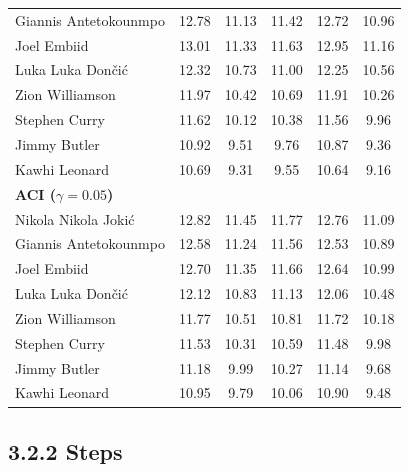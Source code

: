 \documentclass[11pt,a4paper]{article}
\begin{document}
\begin{table}[H]
\begin{tabular}{lccccc}
Giannis Antetokounmpo & 12.78 & 11.13 & 11.42 & 12.72 & 10.96 \\
Joel Embiid & 13.01 & 11.33 & 11.63 & 12.95 & 11.16 \\
Luka Luka Don\v{c}i\'{c} & 12.32 & 10.73 & 11.00 & 12.25 & 10.56 \\
Zion Williamson & 11.97 & 10.42 & 10.69 & 11.91 & 10.26 \\
Stephen Curry & 11.62 & 10.12 & 10.38 & 11.56 & 9.96 \\
Jimmy Butler & 10.92 & 9.51 & 9.76 & 10.87 & 9.36 \\
Kawhi Leonard & 10.69 & 9.31 & 9.55 & 10.64 & 9.16 \\
\midrule
\multicolumn{6}{l}{\textbf{ACI ($\gamma=0.05$)}} \\
\midrule
Nikola Nikola Joki\'{c} & 12.82 & 11.45 & 11.77 & 12.76 & 11.09 \\
Giannis Antetokounmpo & 12.58 & 11.24 & 11.56 & 12.53 & 10.89 \\
Joel Embiid & 12.70 & 11.35 & 11.66 & 12.64 & 10.99 \\
Luka Luka Don\v{c}i\'{c} & 12.12 & 10.83 & 11.13 & 12.06 & 10.48 \\
Zion Williamson & 11.77 & 10.51 & 10.81 & 11.72 & 10.18 \\
Stephen Curry & 11.53 & 10.31 & 10.59 & 11.48 & 9.98 \\
Jimmy Butler & 11.18 & 9.99 & 10.27 & 11.14 & 9.68 \\
Kawhi Leonard & 10.95 & 9.79 & 10.06 & 10.90 & 9.48 \\
\bottomrule
\end{tabular}
\end{table}

\subsection{3.2.2 Steps}
\end{document}
